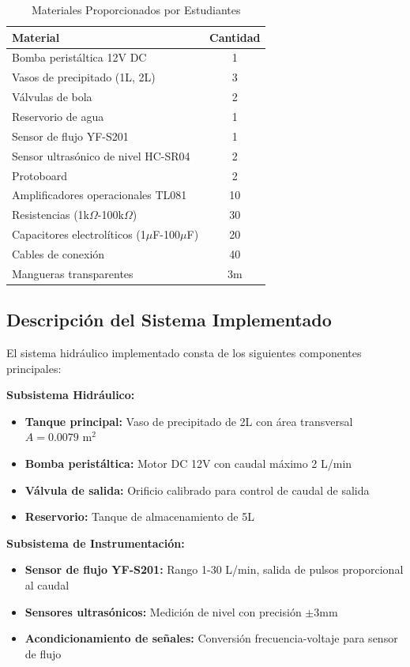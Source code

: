 \documentclass[conference]{IEEEtran}
\begin{document}
\begin{table}[htbp]
\centering
\caption{Materiales Proporcionados por Estudiantes}
\label{tab:materiales_est}
\footnotesize
\begin{tabularx}{\columnwidth}{Xc}
\toprule
\textbf{Material} & \textbf{Cantidad} \\
\midrule
Bomba peristáltica 12V DC & 1 \\
Vasos de precipitado (1L, 2L) & 3 \\
Válvulas de bola & 2 \\
Reservorio de agua & 1 \\
Sensor de flujo YF-S201 & 1 \\
Sensor ultrasónico de nivel HC-SR04 & 2 \\
Protoboard & 2 \\
Amplificadores operacionales TL081 & 10 \\
Resistencias (1k$\Omega$-100k$\Omega$) & 30 \\
Capacitores electrolíticos (1$\mu$F-100$\mu$F) & 20 \\
Cables de conexión & 40 \\
Mangueras transparentes & 3m \\
\bottomrule
\end{tabularx}
\end{table}

\subsection{Descripción del Sistema Implementado}

El sistema hidráulico implementado consta de los siguientes componentes principales:

\textbf{Subsistema Hidráulico:}
\begin{itemize}
\item \textbf{Tanque principal:} Vaso de precipitado de 2L con área transversal $A = 0.0079$ m$^2$
\item \textbf{Bomba peristáltica:} Motor DC 12V con caudal máximo 2 L/min
\item \textbf{Válvula de salida:} Orificio calibrado para control de caudal de salida
\item \textbf{Reservorio:} Tanque de almacenamiento de 5L
\end{itemize}

\textbf{Subsistema de Instrumentación:}
\begin{itemize}
\item \textbf{Sensor de flujo YF-S201:} Rango 1-30 L/min, salida de pulsos proporcional al caudal
\item \textbf{Sensores ultrasónicos:} Medición de nivel con precisión $\pm$3mm
\item \textbf{Acondicionamiento de señales:} Conversión frecuencia-voltaje para sensor de flujo
\end{itemize}
\end{document}
